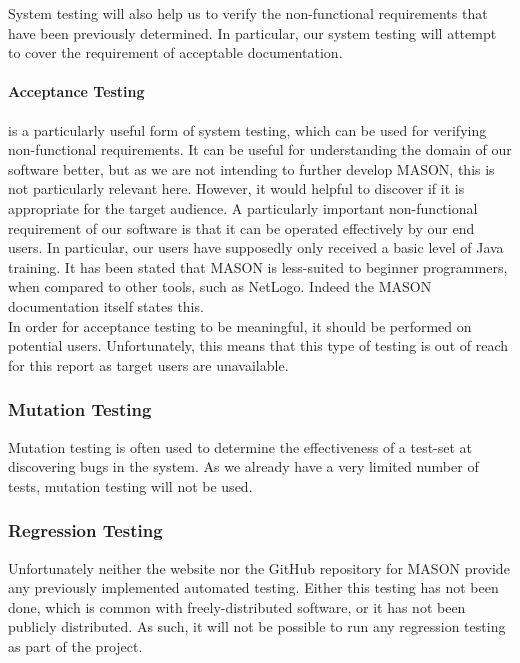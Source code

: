 \documentclass[11pt]{article}
\begin{document}
System testing will also help us to verify the non-functional requirements that have been previously determined.
In particular, our system testing will attempt to cover the requirement of acceptable documentation.

\paragraph{Acceptance Testing}
is a particularly useful form of system testing, which can be used for verifying non-functional requirements.
It can be useful for understanding the domain of our software better, but as we are not intending to further develop MASON, this is not particularly relevant here.
However, it would helpful to discover if it is appropriate for the target audience.
A particularly important non-functional requirement of our software is that it can be operated effectively by our end users.
In particular, our users have supposedly only received a basic level of Java training.
It has been stated that MASON is less-suited to beginner programmers, when compared to other tools, such as NetLogo\cite{abm_platforms_review}.
Indeed the MASON documentation itself states this\cite[pp.8]{mason_doc}.
\\

In order for acceptance testing to be meaningful, it should be performed on potential users.
Unfortunately, this means that this type of testing is out of reach for this report as target users are unavailable.

\subsubsection{Mutation Testing}
Mutation testing is often used to determine the effectiveness of a test-set at discovering bugs in the system.
As we already have a very limited number of tests, mutation testing will not be used.

\subsubsection{Regression Testing}
Unfortunately neither the website nor the GitHub repository for MASON provide any previously implemented automated testing.
Either this testing has not been done, which is common with freely-distributed software, or it has not been publicly distributed.
As such, it will not be possible to run any regression testing as part of the project.
\end{document}
